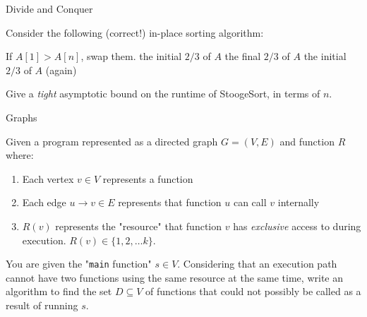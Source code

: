 \documentclass{beamer}
\begin{document}
\begin{frame}[t]{Divide and Conquer}

Consider the following (correct!) in-place sorting algorithm:

\begin{algorithmic}[1]
        \State If $A[1] > A[n]$, swap them.
            \State {} the initial $2/3$ of $A$
            \State {} the final $2/3$ of $A$
            \State {} the initial $2/3$ of $A$ (again)
        \EndIf
    \EndProcedure
\end{algorithmic}

Give a \emph{tight} asymptotic bound on the runtime of StoogeSort, in terms of $n$.

\end{frame}

\begin{frame}[t]{Graphs}

Given a program represented as a directed graph $G = (V, E)$ and function $R$ where:
\begin{enumerate}[-]
    \item Each vertex $v \in V$ represents a function
    \item Each edge $u \to v \in E$ represents that function $u$ can call $v$ internally
    \item $R(v)$ represents the "resource" that function $v$ has \emph{exclusive} access to during execution. $R(v) \in \{1, 2, \dots k\}$.
\end{enumerate}

You are given the "\texttt{main} function" $s \in V$. Considering that an execution path cannot have two functions using the same resource at the same time, write an algorithm to find the set $D \subseteq V$ of functions that could not possibly be called as a result of running $s$.


\end{frame}
\end{document}
